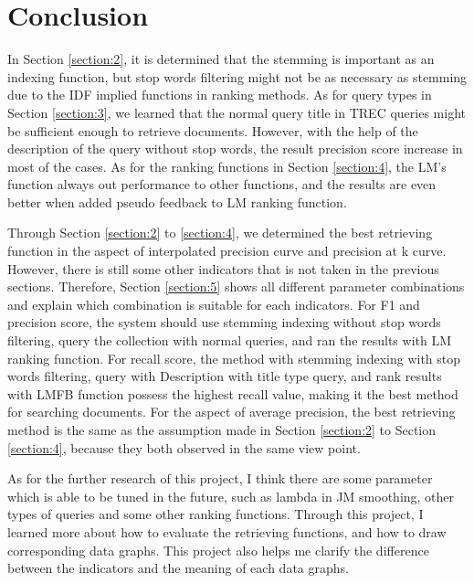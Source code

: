 \documentclass[10pt, a4paper]{article}
\begin{document}
\section{Conclusion}

In Section \ref{section:2}, it is determined that the stemming is important as an indexing function, but stop words filtering might not be as necessary as stemming due to the IDF implied functions in ranking methods. As for query types in Section \ref{section:3}, we learned that the normal query title in TREC queries might be sufficient enough to retrieve documents. However, with the help of the description of the query without stop words, the result precision score increase in most of the cases. As for the ranking functions in Section \ref{section:4}, the LM's function always out performance to other functions, and the results are even better when added pseudo feedback to LM ranking function.

Through Section \ref{section:2} to \ref{section:4}, we determined the best retrieving function in the aspect of interpolated precision curve and precision at k curve. However, there is still some other indicators that is not taken in the previous sections. Therefore, Section \ref{section:5} shows all different parameter combinations and explain which combination is suitable for each indicators. For F1 and precision score, the system should use stemming indexing without stop words filtering, query the collection with normal queries, and ran the results with LM ranking function. For recall score, the method with stemming indexing with stop words filtering, query with Description with title type query, and rank results with LMFB function possess the highest recall value, making it the best method for searching documents. For the aspect of average precision, the best retrieving method is the same as the assumption made in Section \ref{section:2} to Section \ref{section:4}, because they both observed in the same view point.
 
As for the further research of this project, I think there are some parameter which is able to be tuned in the future, such as lambda in JM smoothing, other types of queries and some other ranking functions. Through this project, I learned more about how to evaluate the retrieving functions, and how to draw corresponding data graphs. This project also helps me clarify the difference between the indicators and the meaning of each data graphs. 


% 
\end{document}
